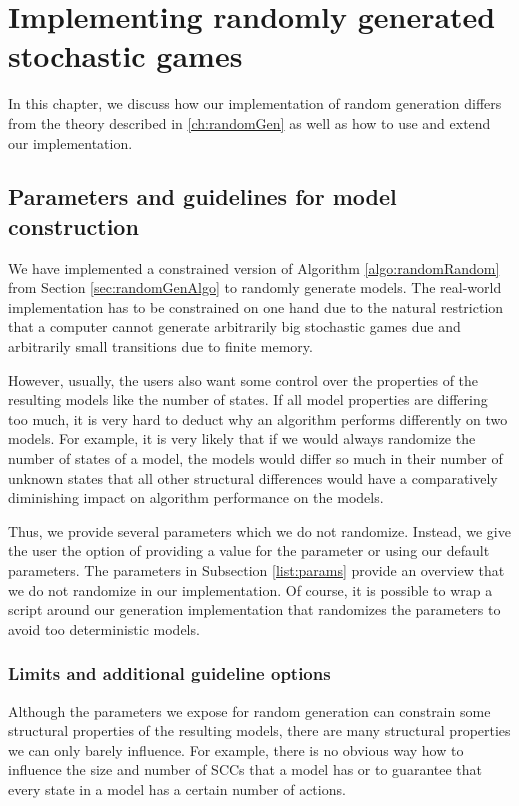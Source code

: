 \chapter{Implementing randomly generated stochastic games} \label{ch:implementedRandomGen}
In this chapter, we discuss how our implementation of random generation differs from the theory described in \ref{ch:randomGen} as well as how to use and extend our implementation. 

\section{Parameters and guidelines for model construction} \label{sec:guidelines}
We have implemented a constrained version of Algorithm \ref{algo:randomRandom} from Section \ref{sec:randomGenAlgo} to randomly generate models.
The real-world implementation has to be constrained on one hand due to the natural restriction that a computer cannot generate arbitrarily big stochastic games due and 
arbitrarily small transitions due to finite memory.

However, usually, the users also want some control over the properties of the resulting models like the number of states.
If all model properties are differing too much, it is very hard to deduct why an algorithm performs differently on two models.
For example, it is very likely that if we would always randomize the number of states of a model, the models would differ so much in their number of unknown states that all other structural differences 
would have a comparatively diminishing impact on algorithm performance on the models.

Thus, we provide several parameters which we do not randomize. Instead, we give the user the option of providing a value for the parameter or using our default parameters.
The parameters in Subsection \ref{list:params} provide an overview that we do not randomize in our implementation.
Of course, it is possible to wrap a script around our generation implementation that randomizes the parameters to avoid too deterministic models.

\subsection{Limits and additional guideline options}
Although the parameters we expose for random generation can constrain some structural properties of the resulting models, 
there are many structural properties we can only barely influence. For example, there is no obvious way how to influence the size and number of SCCs that a model has or to guarantee
that every state in a model has a certain number of actions.

